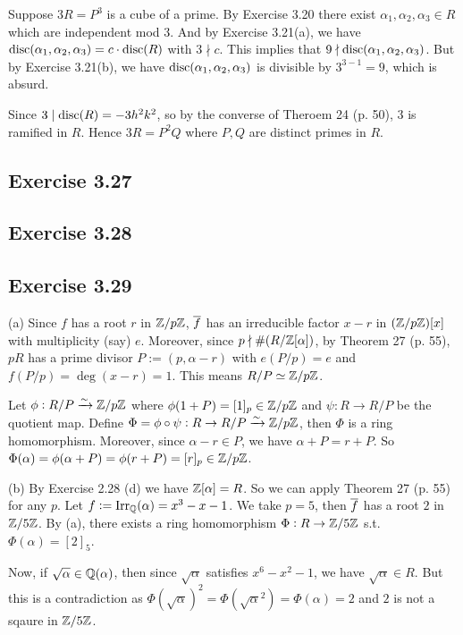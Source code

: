 \documentclass[../Marcus.tex]{subfiles}
\begin{document}
Suppose $3R = P^3$ is a cube of a prime. By Exercise 3.20 there exist $\alpha_1,\alpha_2,\alpha_3 \in R$ which are independent mod $3$. And by Exercise 3.21(a), we have $\operatorname{disc}(\alpha_1,\alpha_2,\alpha_3) = c\cdot\operatorname{disc}(R)$ with $3\nmid c$. This implies that $9 \nmid \operatorname{disc}(\alpha_1,\alpha_2,\alpha_3)$. But by Exercise 3.21(b), we have $\operatorname{disc}(\alpha_1,\alpha_2,\alpha_3)$ is divisible by $3^{3-1} = 9$, which is absurd.

Since $3 \mid \operatorname{disc}(R) = -3h^2k^2$, so by the converse of Theroem 24 (p. 50), $3$ is ramified in $R$. Hence $3R = P^2Q$ where $P,Q$ are distinct primes in $R$.

\subsection*{Exercise 3.27}

\subsection*{Exercise 3.28}

\subsection*{Exercise 3.29}

(a) Since $f$ has a root $r$ in $\mathbb{Z}/p\mathbb{Z}$, $\overline{f}$ has an irreducible factor $x-r$ in $(\mathbb{Z}/p\mathbb{Z})[x]$ with multiplicity (say) $e$. Moreover, since $p\nmid \#(R/\mathbb{Z}[\alpha])$, by Theorem 27 (p. 55), $pR$ has a prime divisor $P:=(p,\alpha-r)$ with $e(P/p)=e$ and $f(P/p)=\deg(x-r)=1$. This means $R/P\simeq \mathbb{Z}/p\mathbb{Z}$.

Let $\phi:R/P\xrightarrow{\sim}\mathbb{Z}/p\mathbb{Z}$ where $\phi(1+P)=[1]_p\in\mathbb{Z}/p\mathbb{Z}$ and $\psi:R\to R/P$ be the quotient map. Define $\Phi=\phi\circ\psi:R\to R/P\xrightarrow{\sim}\mathbb{Z}/p\mathbb{Z}$, then $\Phi$ is a ring homomorphism. Moreover, since $\alpha-r\in P$, we have $\alpha+P=r+P$. So $\Phi(\alpha)=\phi(\alpha+P)=\phi(r+P)=[r]_p\in\mathbb{Z}/p\mathbb{Z}$.

(b) By Exercise 2.28 (d) we have $\mathbb{Z}[\alpha]=R$. So we can apply Theorem 27 (p. 55) for any $p$. Let $f:=\operatorname{Irr}_{\mathbb{Q}}(\alpha)=x^3-x-1$. We take $p=5$, then $\overline{f}$ has a root $2$ in $\mathbb{Z}/5\mathbb{Z}$. By (a), there exists a ring homomorphism $\Phi:R\to\mathbb{Z}/5\mathbb{Z}$ s.t. $\Phi(\alpha)=[2]_5$.

Now, if $\sqrt{\alpha}\in\mathbb{Q}(\alpha)$, then since $\sqrt{\alpha}$ satisfies $x^6-x^2-1$, we have $\sqrt{\alpha}\in R$. But this is a contradiction as $\Phi(\sqrt{\alpha})^2=\Phi(\sqrt{\alpha}^2)=\Phi(\alpha)=2$ and $2$ is not a sqaure in $\mathbb{Z}/5\mathbb{Z}$.
\end{document}
